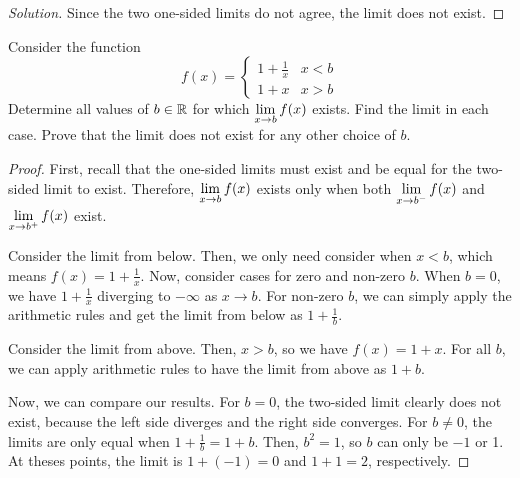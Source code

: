 \documentclass{agony}
\begin{document}
\begin{enumerate}[(a)]
\begin{proof}[Solution]
          Since the two one-sided limits do not agree, the limit does not exist.
        \end{proof}
\end{enumerate}

\question Consider the function
\[ f(x) = \begin{cases} 1+\frac{1}{x} & x < b \\ 1 + x & x > b \end{cases} \]
Determine all values of $b\in\mathbb{R}$ for which $\lim\limits_{x\to b} f(x)$ exists.
Find the limit in each case.
Prove that the limit does not exist for any other choice of $b$.
\begin{proof}
  First, recall that the one-sided limits must exist and be equal for the two-sided limit to exist.
  Therefore, $\lim\limits_{x\to b} f(x)$ exists only when both $\lim\limits_{x\to b^-}f(x)$ and $\lim\limits_{x\to b^+}f(x)$ exist.

  Consider the limit from below.
  Then, we only need consider when $x < b$, which means $f(x) = 1+\frac1x$.
  Now, consider cases for zero and non-zero $b$.
  When $b=0$, we have $1+\textstyle\frac{1}{x}$ diverging to $-\infty$ as $x \to b$.
  For non-zero $b$, we can simply apply the arithmetic rules and get the limit from below as $1+\frac1b$.

  Consider the limit from above.
  Then, $x > b$, so we have $f(x) = 1+x$.
  For all $b$, we can apply arithmetic rules to have the limit from above as $1+b$.

  Now, we can compare our results.
  For $b=0$, the two-sided limit clearly does not exist, because the left side diverges and the right side converges.
  For $b \neq 0$, the limits are only equal when $1+\frac1b = 1+b$.
  Then, $b^2 = 1$, so $b$ can only be $-1$ or 1.
  At theses points, the limit is $1+(-1)=0$ and $1+1=2$, respectively.
\end{proof}
\end{document}
